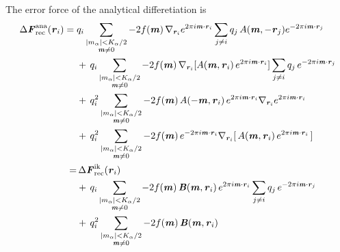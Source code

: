 \documentclass[aps,pre,preprint]{revtex4}
\renewcommand{\v}[1]{\textbf{\textit{#1}}}
\begin{document}
The error force of the analytical differetiation is 
\begin{align}\nonumber
  \Delta\v F_{\textrm{rec}}^{\textrm{ana}}(\v r_i)
  =\;&
  q_i
  \sum_{
    \begin{subarray}{c}
      \vert m_{\alpha}\vert < K_\alpha/2\\
      \v m\neq 0
    \end{subarray}}
  -2f(\v m)\,
  \nabla_{\v r_i}
  e^{2\pi i\v m\cdot \v r_i}
  \sum_{j\neq i}q_j\,
  A(\v m, -\v r_j)
  e^{-2\pi i\v m\cdot\v r_j} \\\nonumber
  & +\,
  q_i
  \sum_{
    \begin{subarray}{c}
      \vert m_{\alpha}\vert < K_\alpha/2\\
      \v m\neq 0
    \end{subarray}}
  -2f(\v m)\,
  \nabla_{\v r_i}
  [A(\v m, \v r_i)\,
  e^{2\pi i\v m\cdot \v r_i} ]
  \sum_{j\neq i}q_j\,
  e^{-2\pi i\v m\cdot\v r_j} \\\nonumber
  & +\,
  q^2_i
  \sum_{
    \begin{subarray}{c}
      \vert m_{\alpha}\vert < K_\alpha/2\\
      \v m\neq 0
    \end{subarray}}
  -2f(\v m)\,
  A(-\v m, \v r_i)\,e^{2\pi i\v m\cdot \v r_i} \nabla_{\v r_i}e^{2\pi i\v m\cdot\v r_i} \\
  & +\,
  q^2_i
  \sum_{
    \begin{subarray}{c}
      \vert m_{\alpha}\vert < K_\alpha/2\\
      \v m\neq 0
    \end{subarray}}
  -2f(\v m)\,
  e^{-2\pi i\v m\cdot \v r_i}
  \nabla_{\v r_i} [\,A(\v m, \v r_i) \,e^{2\pi i\v m\cdot\v r_i}\,]  \\\nonumber
  =&\,
  \Delta\v F_{\textrm{rec}}^{\textrm{ik}}(\v r_i)\\\nonumber
  & +\,
  q_i
  \sum_{
    \begin{subarray}{c}
      \vert m_{\alpha}\vert < K_\alpha/2\\
      \v m\neq 0
    \end{subarray}}
  -2f(\v m)\,
  \v B(\v m, \v r_i)\,e^{2\pi i\v m\cdot \v r_i}
  \sum_{j\neq i}q_j\,
  e^{-2\pi i\v m\cdot\v r_j} \\
  & +\,
  q^2_i
  \sum_{
    \begin{subarray}{c}
      \vert m_{\alpha}\vert < K_\alpha/2\\
      \v m\neq 0
    \end{subarray}}
  -2f(\v m)\,\v B(\v m, \v r_i) 
\end{align}
\end{document}
